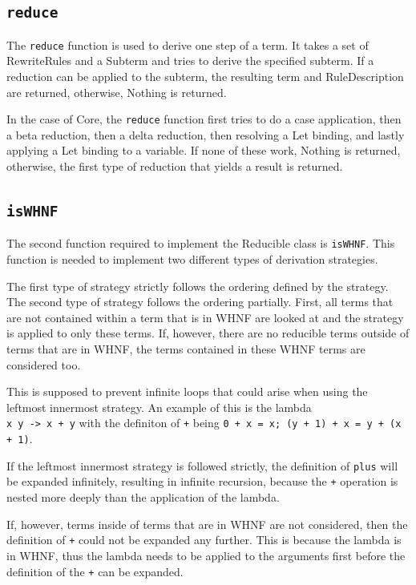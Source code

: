 \subsection{\texttt{reduce}}
The \texttt{reduce} function is used to derive one step of a term.
It takes a set of RewriteRules and a Subterm and tries to derive the specified subterm.
If a reduction can be applied to the subterm,
the resulting term and RuleDescription are returned, otherwise, Nothing is returned.

In the case of Core,
the \texttt{reduce} function first tries to do a case application,
then a beta reduction,
then a delta reduction,
then resolving a Let binding,
and lastly applying a Let binding to a variable.
If none of these work,
Nothing is returned,
otherwise, the first type of reduction that yields a result is returned.

\subsection{\texttt{isWHNF}}
The second function required to implement the Reducible class is \texttt{isWHNF}.
This function is needed to implement two different types of derivation strategies.

The first type of strategy strictly follows the ordering defined by the strategy.
The second type of strategy follows the ordering partially.
First, all terms that are not contained within a term that is in WHNF are looked at and the strategy is applied to only these terms.
If, however, there are no reducible terms outside of terms that are in WHNF,
the terms contained in these WHNF terms are considered too.

This is supposed to prevent infinite loops that could arise when using the leftmost innermost strategy.
An example of this is the lambda \texttt{\\x y -> x + y} with the definiton of \texttt{+} being \texttt{0 + x = x; (y + 1) + x = y + (x + 1)}.

If the leftmost innermost strategy is followed strictly,
the definition of \texttt{plus} will be expanded infinitely, resulting in infinite recursion,
because the \texttt{+} operation is nested more deeply than the application of the lambda.

If, however, terms inside of terms that are in WHNF are not considered,
then the definition of \texttt{+} could not be expanded any further.
This is because the lambda is in WHNF,
thus the lambda needs to be applied to the arguments first before the definition of the \texttt{+} can be expanded.

